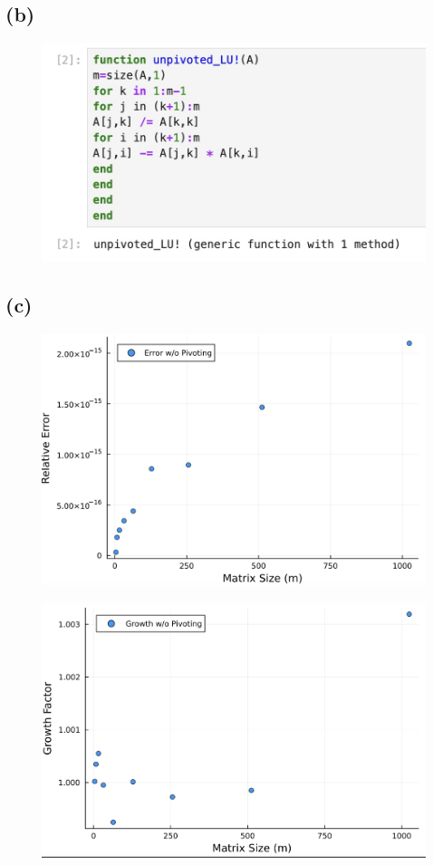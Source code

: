 \documentclass{article}
\begin{document}
\subsection{(b)}
\begin{figure}[H]

    \includegraphics[width=0.75\linewidth]{Image 2-20-24 at 07.13.jpeg}



\end{figure}
\subsection{(c)}
    \begin{figure}[H]
        \includegraphics[width=0.75\linewidth]{Image 2-20-24 at 07.49.jpeg}
    \end{figure}

\begin{figure}[H]
    \includegraphics[width=0.75\linewidth]{Image 2-20-24 at 07.49 (1).jpeg}
    
    
\end{figure}
\end{document}
